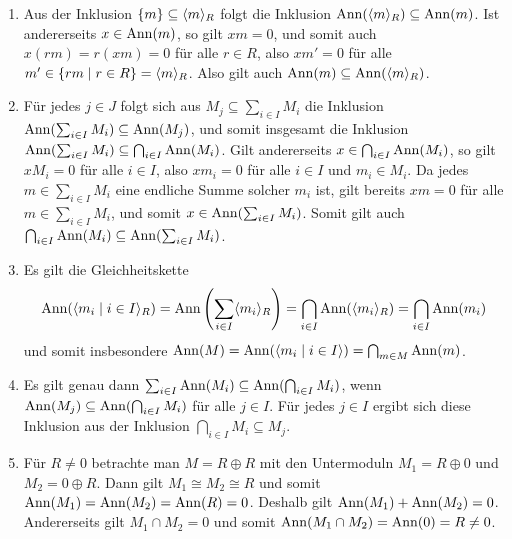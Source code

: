\begin{solution}
  \begin{enumerate}
    \item
      Aus der Inklusion $\{m\} \subseteq \langle m\rangle_R$ folgt die Inklusion $\operatorname{Ann}( \langle m\rangle_R ) \subseteq \operatorname{Ann}(m)$.
      Ist andererseits $x \in \operatorname{Ann}(m)$, so gilt $xm = 0$, und somit auch $x(rm) = r(xm) = 0$ für alle $r \in R$, also $xm' = 0$ für alle $m' \in \{rm \mid r \in R\} = \langle m\rangle_R$.
      Also gilt auch $\operatorname{Ann}(m) \subseteq \operatorname{Ann}(\langle m\rangle_R)$.
      
    \item
      Für jedes $j \in J$ folgt sich aus $M_j \subseteq \sum_{i \in I} M_i$ die Inklusion $\operatorname{Ann}( \sum_{i \in I} M_i ) \subseteq \operatorname{Ann}(M_j)$, und somit insgesamt die Inklusion $\operatorname{Ann}( \sum_{i \in I} M_i ) \subseteq \bigcap_{i \in I} \operatorname{Ann}(M_i)$.
      Gilt andererseits $x \in \bigcap_{i \in I} \operatorname{Ann}(M_i)$, so gilt $x M_i = 0$ für alle $i \in I$, also $x m_i = 0$ für alle $i \in I$ und $m_i \in M_i$.
      Da jedes $m \in \sum_{i \in I} M_i$ eine endliche Summe solcher $m_i$ ist, gilt bereits $xm = 0$ für alle $m \in \sum_{i \in I} M_i$, und somit $x \in \operatorname{Ann}( \sum_{i \in I} M_i )$.
      Somit gilt auch $\bigcap_{i \in I} \operatorname{Ann}( M_i ) \subseteq \operatorname{Ann}( \sum_{i \in I} M_i )$.
      
    \item
      Es gilt die Gleichheitskette
      \[
          \operatorname{Ann}( \langle m_i \mid i \in I\rangle_R )
        = \operatorname{Ann}\left( \sum_{i \in I} \langle m_i\rangle_R \right)
        = \bigcap_{i \in I} \operatorname{Ann}( \langle m_i\rangle_R )
        = \bigcap_{i \in I} \operatorname{Ann}(m_i)
      \]
      und somit insbesondere $\operatorname{Ann}(M) = \operatorname{Ann}(\langle m_i \mid i \in I\rangle) = \bigcap_{m \in M} \operatorname{Ann}(m)$.
      
    \item
      Es gilt genau dann $\sum_{i \in I} \operatorname{Ann}(M_i) \subseteq \operatorname{Ann}( \bigcap_{i \in I} M_i )$, wenn $\operatorname{Ann}(M_j) \subseteq \operatorname{Ann}( \bigcap_{i \in I} M_i )$ für alle $j \in I$.
      Für jedes $j \in I$ ergibt sich diese Inklusion aus der Inklusion $\bigcap_{i \in I} M_i \subseteq M_j$.
      
    \item
      Für $R \neq 0$ betrachte man $M = R \oplus R$ mit den Untermoduln $M_1 = R \oplus 0$ und $M_2 = 0 \oplus R$.
      Dann gilt $M_1 \cong M_2 \cong R$ und somit $\operatorname{Ann}(M_1) = \operatorname{Ann}(M_2) = \operatorname{Ann}(R) = 0$.
      Deshalb gilt $\operatorname{Ann}(M_1) + \operatorname{Ann}(M_2) = 0$.
      Andererseits gilt $M_1 \cap M_2 = 0$ und somit $\operatorname{Ann}(M_1 \cap M_2) = \operatorname{Ann}(0) = R \neq 0$.
  \end{enumerate}
\end{solution}



